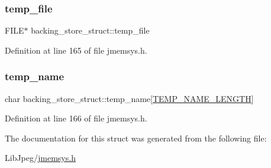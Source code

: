 \subsubsection{\texorpdfstring{temp\_file}{temp\_file}}
{\footnotesize\ttfamily F\+I\+LE$\ast$ backing\+\_\+store\+\_\+struct\+::temp\+\_\+file}



Definition at line 165 of file jmemsys.\+h.

\mbox{\label{structbacking__store__struct_aee24b7268410bcf129e83a8e2a2f4d45}} 
\subsubsection{\texorpdfstring{temp\_name}{temp\_name}}
{\footnotesize\ttfamily char backing\+\_\+store\+\_\+struct\+::temp\+\_\+name\mbox{[}\mbox{\hyperlink{jmemsys_8h_a83c496c242b727d7c2def22f79f75d1a}{T\+E\+M\+P\+\_\+\+N\+A\+M\+E\+\_\+\+L\+E\+N\+G\+TH}}\mbox{]}}



Definition at line 166 of file jmemsys.\+h.



The documentation for this struct was generated from the following file\+:\begin{DoxyCompactItemize}
\item 
Lib\+Jpeg/\mbox{\hyperlink{jmemsys_8h}{jmemsys.\+h}}\end{DoxyCompactItemize}
